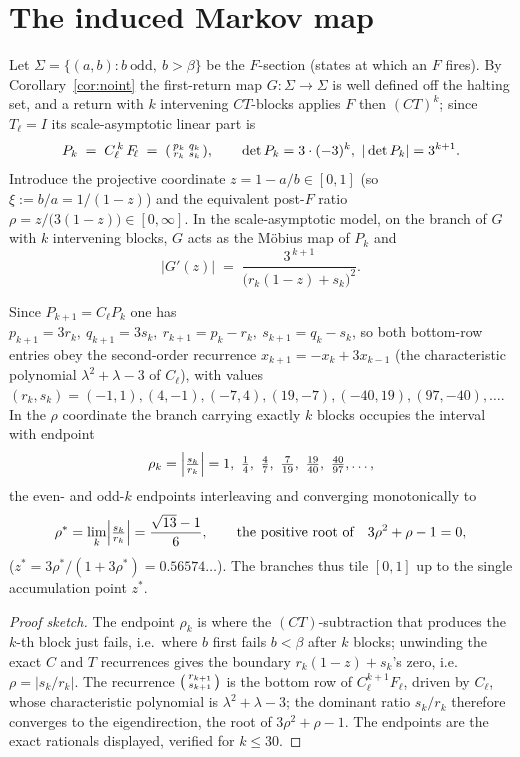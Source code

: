 \documentclass[11pt]{article}
\theoremstyle{definition}\newtheorem{definition}{Definition}
\theoremstyle{remark}\newtheorem{remark}{Remark}
\newcommand{\Flin}{F_{\!\ell}}\newcommand{\Clin}{C_{\ell}}
\begin{document}
\section{The induced Markov map}
Let $\Sigma=\{(a,b):b\ \text{odd},\ b>\beta\}$ be the $F$-section (states at
which an $F$ fires). By Corollary~\ref{cor:noint} the first-return map
$G:\Sigma\to\Sigma$ is well defined off the halting set, and a return with
$k$ intervening $CT$-blocks applies $F$ then $(CT)^k$; since $T_\ell=I$ its
scale-asymptotic linear part is
\begin{equation}\label{eq:Pk}
P_k \;=\; \Clin^{\,k}\,\Flin \;=\;\begin{psmallmatrix}p_k&q_k\\ r_k&s_k\end{psmallmatrix},\qquad \det P_k=3\cdot(-3)^k,\ |\det P_k|=3^{k+1}.
\end{equation}
Introduce the projective coordinate $z=1-a/b\in[0,1]$ (so $\xi:=b/a=1/(1-z)$)
and the equivalent post-$F$ ratio $\rho=z/\bigl(3(1-z)\bigr)\in[0,\infty]$.
In the scale-asymptotic model, on the branch of $G$ with $k$ intervening
blocks, $G$ acts as the M\"obius map of $P_k$ and
\begin{equation}\label{eq:deriv}
|G'(z)| \;=\; \frac{3^{\,k+1}}{\bigl(r_k(1-z)+s_k\bigr)^2}.
\end{equation}

\begin{lemma}\label{lem:branch}
Since $P_{k+1}=\Clin P_k$ one has $p_{k+1}=3r_k,\ q_{k+1}=3s_k,\
r_{k+1}=p_k-r_k,\ s_{k+1}=q_k-s_k$, so both bottom-row entries obey the
second-order recurrence $x_{k+1}=-x_k+3x_{k-1}$ (the characteristic
polynomial $\lambda^2+\lambda-3$ of $\Clin$), with values
$(r_k,s_k)=(-1,1),(4,-1),(-7,4),(19,-7),(-40,19),(97,-40),\dots$. In the
$\rho$ coordinate the branch carrying exactly $k$ blocks occupies the
interval with endpoint
\[
\rho_k=\Bigl|\tfrac{s_k}{r_k}\Bigr|
= 1,\ \tfrac14,\ \tfrac47,\ \tfrac{7}{19},\ \tfrac{19}{40},\ \tfrac{40}{97},\dots,
\]
the even- and odd-$k$ endpoints interleaving and converging monotonically to
\[
\rho^\ast=\lim_k \Bigl|\tfrac{s_k}{r_k}\Bigr|=\frac{\sqrt{13}-1}{6},
\qquad\text{the positive root of}\quad 3\rho^2+\rho-1=0,
\]
($z^\ast=3\rho^\ast/(1+3\rho^\ast)=0.56574\ldots$). The branches thus tile
$[0,1]$ up to the single accumulation point $z^\ast$.
\end{lemma}
\begin{proof}[Proof sketch]
The endpoint $\rho_k$ is where the $(CT)$-subtraction that produces the
$k$-th block just fails, i.e.\ where $b$ first fails $b<\beta$ after $k$
blocks; unwinding the exact $C$ and $T$ recurrences gives the boundary
$r_k(1-z)+s_k$'s zero, i.e.\ $\rho=|s_k/r_k|$. The recurrence
$\begin{psmallmatrix}r_{k+1}\\ s_{k+1}\end{psmallmatrix}$ is the bottom row
of $\Clin^{k+1}\Flin$, driven by $\Clin$, whose characteristic polynomial
is $\lambda^2+\lambda-3$; the dominant ratio $s_k/r_k$ therefore converges
to the eigendirection, the root of $3\rho^2+\rho-1$. The endpoints are the
exact rationals displayed, verified for $k\le 30$.
\end{proof}
\end{document}
